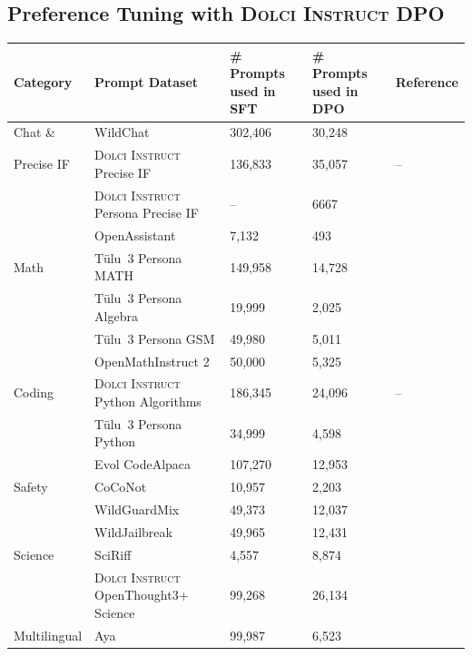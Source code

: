 \documentclass[table]{ai2style/ai2}
\newcommand{\tulu}{T\"ulu~3\xspace}
\newcommand{\dolciinstruct}{\textsc{Dolci Instruct}\xspace}
\newcommand{\dolciinstructdpo}{\textsc{Dolci Instruct DPO}\xspace}
\begin{document}
{{\subsection{Preference Tuning with \dolciinstructdpo}
\begin{table}[t!]
\centering
\setlength\tabcolsep{5pt}
{\small
\begin{tabular}{ll R{1.5cm} R{1.5cm} l}
\toprule
{\bf Category} & {\bf Prompt Dataset} & {\bf \# Prompts used in SFT} & {\bf \# Prompts used in DPO} & {\bf Reference} \\
\midrule
{} Chat \&  & WildChat & 302,406 & 30,248 & \citet{zhao2024wildchat} \\
 Precise IF & \dolciinstruct Precise IF & 136,833 & 35,057 & -- \\ 
 & \dolciinstruct Persona Precise IF & -- & 6667 & \cite{lambert2024tulu3} \\ 
  & OpenAssistant & 7,132 & 493 & \citet{kopf2024openassistant} \\
Math & \tulu Persona MATH & 149,958 & 14,728 & \citet{lambert2024tulu3} \\
 & \tulu Persona Algebra & 19,999 & 2,025 & \citet{lambert2024tulu3} \\
 & \tulu Persona GSM & 49,980 & 5,011 & \citet{lambert2024tulu3} \\
 & OpenMathInstruct 2 & 50,000 & 5,325 & \citet{toshniwal2024openmathinstruct} \\
 Coding & \dolciinstruct Python Algorithms  & 186,345 & 24,096 & -- \\
   & \tulu Persona Python & 34,999 & 4,598 & \citet{lambert2024tulu3} \\
  & Evol CodeAlpaca & 107,270 & 12,953 & \cite{luo2023wizardcoder} \\  
Safety & CoCoNot & 10,957 & 2,203 & \citet{brahman2024art} \\
 & WildGuardMix & 49,373 & 12,037 & \citet{han2024wildguard} \\
 & WildJailbreak & 49,965 & 12,431 & \citet{jiang2024wildteaming} \\
 Science & SciRiff & 4,557 & 8,874 & \citet{wadden2024sciriff} \\
 & \dolciinstruct OpenThought3+ Science & 99,268  & 26,134 & \citet{guha2025openthoughts} \\
Multilingual & Aya & 99,987 & 6,523 & \citet{singh2024aya} \\

\end{tabular}}
\end{table}}}
\end{document}

